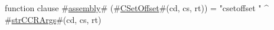 function clause #\hyperref[sailMIPSzassembly]{assembly}# (#\hyperref[sailMIPSzCSetOffset]{CSetOffset}#(cd, cs, rt)) = "csetoffset " ^ #\hyperref[sailMIPSzstrCCRArgs]{strCCRArgs}#(cd, cs, rt)
